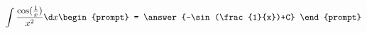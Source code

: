 \documentclass{ximera}
\author{Steven Gubkin}
\begin{document}
\begin{exercise}

\[
\int \frac{\cos(\frac{1}{x})}{x^2} \d x \begin{prompt} = \answer{-\sin(\frac{1}{x})+C} \end{prompt}
\]

\end{exercise}
\end{document}
